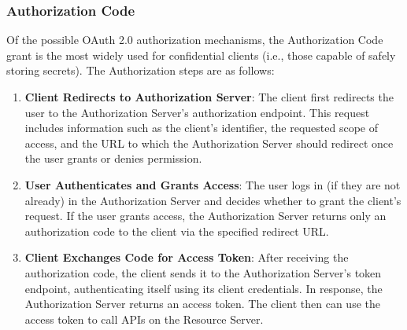 %
%
%

\subsubsection{Authorization Code}
\label{cha:relatedwork:oauth:authcode}

Of the possible OAuth 2.0 authorization mechanisms,
the Authorization Code grant is the most widely used for confidential clients (i.e., those capable of safely storing secrets).
The Authorization steps are as follows:

\begin{enumerate}

  \item \textbf{Client Redirects to Authorization Server}:
    The client first redirects the user to the Authorization Server’s authorization endpoint.
    This request includes information such as the client’s identifier, the requested scope of access,
    and the URL to which the Authorization Server should redirect once the user grants or denies permission.

  \item \textbf{User Authenticates and Grants Access}:
    The user logs in (if they are not already) in the Authorization Server and decides whether to grant the client’s request.
    If the user grants access, the Authorization Server returns only an authorization code to the client via the specified redirect URL.

  \item \textbf{Client Exchanges Code for Access Token}:
    After receiving the authorization code, the client sends it to the Authorization Server’s token endpoint,
    authenticating itself using its client credentials.
    In response, the Authorization Server returns an access token.
    The client then can use the access token to call APIs on the Resource Server.
\end{enumerate}

